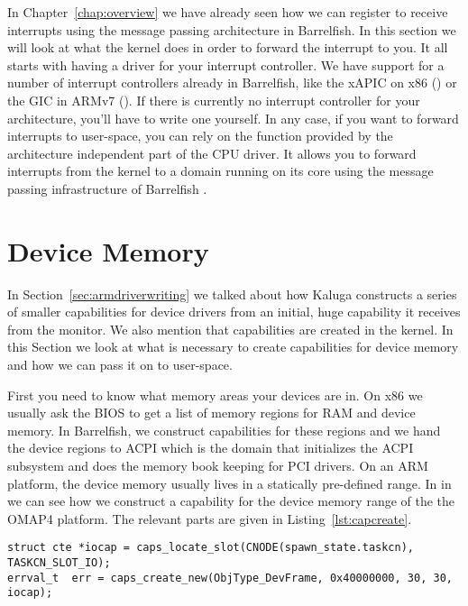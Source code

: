 \documentclass[a4paper,11pt,twoside]{report}
\begin{document}
In Chapter~\ref{chap:overview} we have already seen how we can register to
receive interrupts using the message passing architecture in Barrelfish. In
this section we will look at what the kernel does in order to forward the
interrupt to you. It all starts with having a driver for your interrupt
controller. We have support for a number of interrupt controllers already in
Barrelfish, like the xAPIC on x86 () or the GIC in
ARMv7 (). If there is currently no interrupt
controller for your architecture, you'll have to write one yourself. In any
case, if you want to forward interrupts to user-space, you can rely on the
 function provided by the architecture
independent part of the CPU driver. It allows you to forward interrupts
from the kernel to a domain running on its core using the message passing
infrastructure of Barrelfish \cite{btn011-idc}.


\section{Device Memory}
\label{sec:kernelmemory}

In Section~\ref{sec:armdriverwriting} we talked about how Kaluga constructs a
series of smaller capabilities for device drivers from an initial, huge
capability it receives from the monitor. We also mention that capabilities are
created in the kernel. In this Section we look at what is necessary to
create capabilities for device memory and how we can pass it on to user-space.

First you need to know what memory areas your devices are in. On x86 we
usually ask the BIOS to get a list of memory regions for RAM and device
memory. In Barrelfish, we construct capabilities for these regions and we hand
the device regions to ACPI which is the domain that initializes the ACPI
subsystem and does the memory book keeping for PCI drivers. On an ARM
platform, the device memory usually lives in a statically pre-defined range.
In  in
 we can see how we construct a capability for the
device memory range of the the OMAP4 platform. The relevant parts are
given in Listing~\ref{lst:capcreate}.

\begin{lstlisting}[caption={Creating a cabaility in the kernel and placing
it in the I/O slot in a task cnode.}, label={lst:capcreate}]
struct cte *iocap = caps_locate_slot(CNODE(spawn_state.taskcn), TASKCN_SLOT_IO);
errval_t  err = caps_create_new(ObjType_DevFrame, 0x40000000, 30, 30, iocap);
\end{lstlisting}
\end{document}
